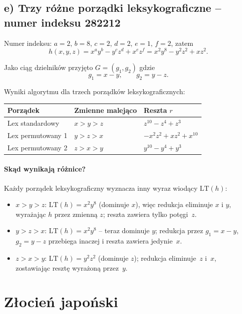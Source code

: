 \documentclass[12pt,a4paper]{article}
\begin{document}
	\subsection{e) Trzy różne porządki leksykograficzne -- numer indeksu 282212}
	
	Numer indeksu: $a=2,\, b=8,\, c=2,\, d=2,\, e=1,\, f=2$, zatem
	\[
	h(x,y,z) = x^a y^b - y^c z^d + x^e z^f = x^2 y^8 - y^2 z^2 + xz^2.
	\]
	
	Jako ciąg dzielników przyjęto $G = (g_1, g_2)$ gdzie
	\[
	g_1 = x - y, \qquad g_2 = y - z.
	\]
	
	Wyniki algorytmu dla trzech porządków leksykograficznych:
	
	\begin{center}
		\begin{tabular}{lll}
			\hline
			\textbf{Porządek} & \textbf{Zmienne malejąco} & \textbf{Reszta $r$} \\
			\hline
			Lex standardowy   & $x > y > z$ & $z^{10} - z^4 + z^3$ \\
			Lex permutowany 1 & $y > z > x$ & $-x^2z^2 + xz^2 + x^{10}$ \\
			Lex permutowany 2 & $z > x > y$ & $y^{10} - y^4 + y^3$ \\
			\hline
		\end{tabular}
	\end{center}
	
	\paragraph{Skąd wynikają różnice?}
	
	Każdy porządek leksykograficzny wyznacza inny wyraz wiodący $\mathrm{LT}(h)$:
	\begin{itemize}
		\item $x > y > z$: $\mathrm{LT}(h) = x^2 y^8$ (dominuje $x$), więc redukcja eliminuje
		$x$ i $y$, wyrażając $h$ przez zmienną $z$; reszta zawiera tylko potęgi~$z$.
		\item $y > z > x$: $\mathrm{LT}(h) = x^2 y^8$ -- teraz dominuje $y$; redukcja przez
		$g_1 = x-y$, $g_2 = y-z$ przebiega inaczej i reszta zawiera jedynie~$x$.
		\item $z > x > y$: $\mathrm{LT}(h) = y^2 z^2$ (dominuje $z$); redukcja eliminuje~$z$
		i~$x$, zostawiając resztę wyrażoną przez~$y$.
	\end{itemize}
	
	\section{Złocień japoński}
	
\end{document}
